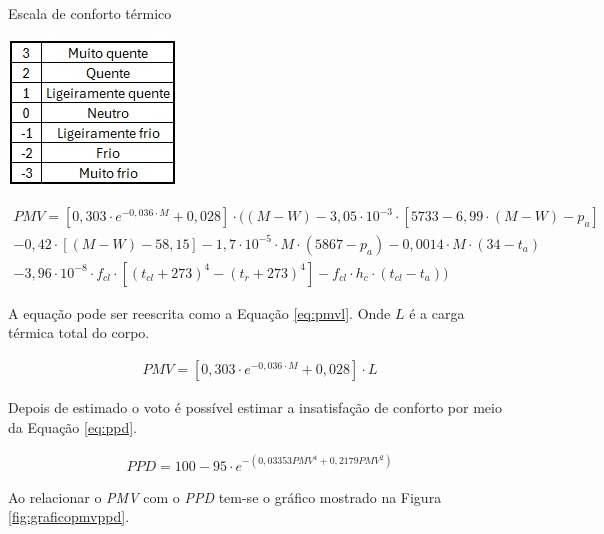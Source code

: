 \documentclass[acronym,symbols,table]{fei}
\begin{document}
\begin{table}[!htb] 
 \centering
    \caption{Escala de conforto térmico }
    \includegraphics[width=0.3\linewidth]{Tabelas/nivel-conforto.jpeg}
    \label{tab: conforto}
\end{table}

\begin{equation} \label{eq:pmv} 
    \begin{aligned}
   PMV = [0,303 \cdot e^{-0,036\cdot M}+0,028]\cdot ((M-W)-3,05\cdot10^{-3}\cdot [5733-6,99\cdot(M-W)-p_{a}]\\
   -0,42\cdot[(M-W)-58,15]-1,7\cdot 10^{-5}\cdot M \cdot(5867-p_{a})-0,0014\cdot M\cdot(34-t_{a})\\
   -3,96\cdot10^{-8}\cdot f_{cl}\cdot[(t_{cl}+273)^4-(t_{r}+273)^4]-f_{cl}\cdot h_{c}\cdot(t_{cl}-t_{a}))
    \end{aligned}
\end{equation}

A equação pode ser reescrita como a Equação \ref{eq:pmvl}. Onde $L$ é a carga térmica total do corpo.

\begin{equation} \label{eq:pmvl}
    \begin{aligned}
   PMV = [0,303 \cdot e^{-0,036\cdot M}+0,028]\cdot L
    \end{aligned}
\end{equation}

Depois de estimado o voto é possível estimar a insatisfação de conforto por meio da Equação \ref{eq:ppd}.

\begin{equation} \label{eq:ppd}
    \begin{aligned}
   PPD = 100 - 95\cdot e^{-(0,03353 PMV^4 + 0,2179PMV^2)}
    \end{aligned}
\end{equation}

Ao relacionar o \textit{PMV} com o \textit{PPD} tem-se o gráfico mostrado na Figura \ref{fig:graficopmvppd}.
\end{document}
